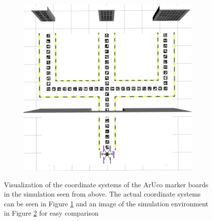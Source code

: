\documentclass[../Head/report.tex]{subfiles}
\begin{document}
\begin{figure}[H]
    \centering
    \begin{subfigure}[t]{.4\textwidth}
        \centering
    \scalebox{0.75}{}
    \caption{}
    \label{fig:2d_view_aruco_coordinate_systems}
    \end{subfigure}
    \hspace{9.5em}
    \begin{subfigure}[t]{.33\textwidth}
        \includegraphics[angle=-0.5,width=1\linewidth]{../Figures/3d-modeling/one_pattern_board_top_view.png}
        \hspace{-0.0em}
        \caption{}
        \label{fig:2d_view_aruco_marker_board}
    \end{subfigure}
    \caption{Visualization of the coordinate systems of the ArUco marker boards in the simulation seen from above. The actual coordinate systems can be seen in Figure \ref{fig:2d_view_aruco_coordinate_systems} and an image of the simulation environment in Figure \ref{fig:2d_view_aruco_marker_board} for easy comparison}
    \label{fig:3d_view_aruco_coordinate_systems}
\end{figure}
\end{document}
